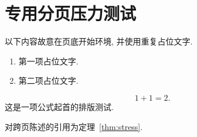     \section{专用分页压力测试}
    以下内容故意在页底开始环境, 并使用重复占位文字.
    \newpage
    \vspace*{0.83\textheight}
    \begin{theorem}[页底题头及跨页陈述的排版占位测试]
        \label{thm:stress}
        \SampleParagraph
        \SampleParagraph
        \SampleParagraph
        \SampleParagraph
        \SampleParagraph
        \SampleParagraph
        \SampleParagraph
        \SampleParagraph
        \SampleParagraph
        \SampleParagraph
        \SampleParagraph
        \SampleParagraph
    \end{theorem}
    \begin{theorem}[以列表开始的陈述]
        \begin{enumerate}
            \item
                第一项占位文字.
            \item
                第二项占位文字.
        \end{enumerate}
    \end{theorem}
    \begin{theorem}[以公式开始的陈述]
        \[
            1 + 1 = 2.
        \]
        这是一项公式起首的排版测试.
    \end{theorem}
    对跨页陈述的引用为定理~\ref{thm:stress}.
\fi
